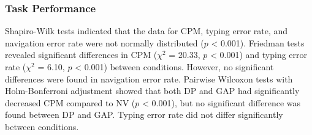 \begin{table*}[!ht]
  \caption{The results of statistical analysis for the SSQ and subjective discomfort scores ($^{\ast} p < 0.001$; $^{\ast\ast} p < 0.05$)}
  \label{tab:stats}
\end{table*}

\subsubsection{Task Performance} Shapiro-Wilk tests indicated that the data for CPM, typing error rate, and navigation error rate were not normally distributed ($p$ < 0.001). Friedman tests revealed significant differences in CPM ($\chi^2$ = 20.33, $p$ < 0.001) and typing error rate ($\chi^2$ = 6.10, $p$ < 0.001) between conditions. However, no significant differences were found in navigation error rate. Pairwise Wilcoxon tests with Holm-Bonferroni adjustment showed that both DP and GAP had significantly decreased CPM compared to NV ($p$ < 0.001), but no significant difference was found between DP and GAP. Typing error rate did not differ significantly between conditions.

